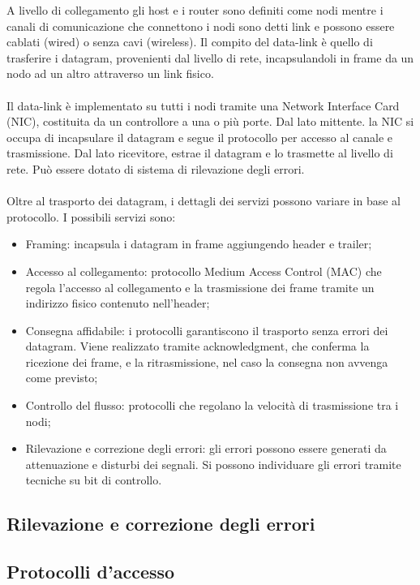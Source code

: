 \documentclass{subfiles}
\begin{document}
    A livello di collegamento gli host e i router sono definiti come nodi mentre i canali di comunicazione che connettono i nodi sono 
    detti link e possono essere cablati (wired) o senza cavi (wireless). Il compito del data-link è quello di trasferire i datagram, 
    provenienti dal livello di rete, incapsulandoli in frame da un nodo ad un altro attraverso un link fisico.\\ \\
    Il data-link è implementato su tutti i nodi tramite una Network Interface Card (NIC), costituita da un controllore a una o più porte.
    Dal lato mittente. la NIC si occupa di incapsulare il datagram e segue il protocollo per accesso al canale e trasmissione. Dal lato 
    ricevitore, estrae il datagram e lo trasmette al livello di rete. Può essere dotato di sistema di rilevazione degli errori.\\ \\
    Oltre al trasporto dei datagram, i dettagli dei servizi possono variare in base al protocollo. I possibili servizi sono:
    \begin{itemize}
        \item Framing: incapsula i datagram in frame aggiungendo header e trailer;
        \item Accesso al collegamento: protocollo Medium Access Control (MAC) che regola l'accesso al collegamento e la trasmissione 
        dei frame tramite un indirizzo fisico contenuto nell'header;
        \item Consegna affidabile: i protocolli garantiscono il trasporto senza errori dei datagram. Viene realizzato tramite 
        acknowledgment, che conferma la ricezione dei frame, e la ritrasmissione, nel caso la consegna non avvenga come previsto;
        \item Controllo del flusso: protocolli che regolano la velocità di trasmissione tra i nodi;
        \item Rilevazione e correzione degli errori: gli errori possono essere generati da attenuazione e disturbi dei segnali. Si 
        possono individuare gli errori tramite tecniche su bit di controllo.
    \end{itemize}

    \subsection{Rilevazione e correzione degli errori}
    

    \subsection{Protocolli d'accesso}
    
    
\end{document}
